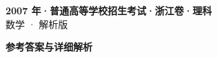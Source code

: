 \documentclass[zihao=-4, a4paper]{ctexart}
\begin{document}
\begin{center}
  {\Large\bfseries 2007 年·普通高等学校招生考试·浙江卷·理科}\\[4pt]
  {\large 数学 · 解析版}
\end{center}
\medskip
{}

\clearpage
{}
\begin{center}{\Large\bfseries 参考答案与详细解析}\end{center}
\medskip

\end{document}
